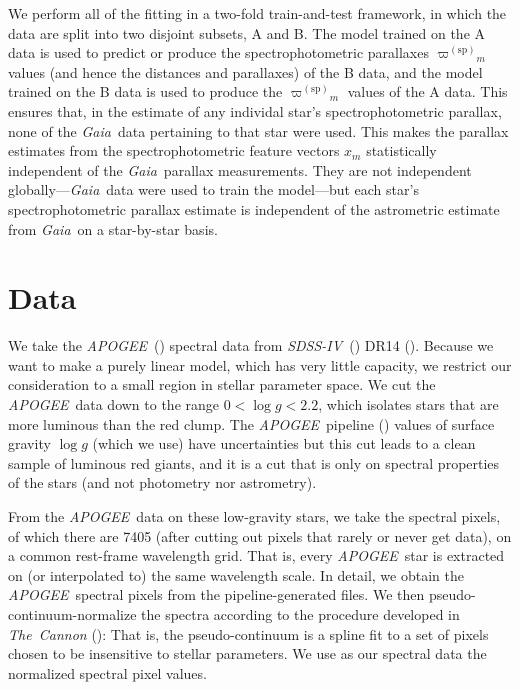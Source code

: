 \documentclass[modern]{aastex62}
\newcommand{\code}[1]{\texttt{\detokenize{#1}}}
\newcommand{\acronym}[1]{{\small{#1}}}
\newcommand{\project}[1]{\textsl{#1}}
\newcommand{\apogee}{\project{\acronym{APOGEE}}}
\newcommand{\gaia}{\project{Gaia}}
\newcommand{\sdssiv}{\project{\acronym{SDSS-IV}}}
\newcommand{\logg}{\log g}
\newcommand{\sparallax}{{\varpi^{(\mathrm{sp})}}}
\begin{document}
We perform all of the fitting in a two-fold train-and-test framework,
in which the data are split into two disjoint subsets, A and B.
The model trained on the A data is used to predict or produce
the spectrophotometric parallaxes $\sparallax_m$ values (and hence
the distances and parallaxes) of the B data,
and the model trained on the B data is used to 
produce the $\sparallax_m$ values of the A data.
This ensures that, in the estimate of any individal star's
spectrophotometric parallax, none of the \gaia\ data pertaining to that star were used.
This makes the parallax estimates from the spectrophotometric feature vectors
$x_m$ statistically independent of the \gaia\ parallax measurements.
They are not independent globally---\gaia\ data were used to train the model---but
each star's spectrophotometric parallax estimate is independent
of the astrometric estimate from \gaia\ on a star-by-star basis.

\section{Data}\label{sec:data}

We take the \apogee\ (\citealt{aapogee, wapogee, apogee}) spectral data
from \sdssiv\ (\citealt{sdssiv}) \acronym{DR14} (\citealt{dr14}).
Because we want to make a purely linear model, which has very little capacity,
we restrict our consideration to a small region in stellar parameter space.
We cut the \apogee\ data down to the range $0<\logg<2.2$, which isolates
stars that are more luminous than the red clump.
The \apogee\ pipeline (\citealt{aspcap})
values of surface gravity $\logg$ (which we use) have uncertainties but
this cut leads to a clean sample of luminous red giants, and it is a cut
that is only on spectral properties of the stars (and not photometry nor astrometry).

From the \apogee\ data on these low-gravity stars, we take the spectral pixels,
of which there are 7405 (after cutting out pixels that rarely or never get data),
on a common rest-frame wavelength grid.
That is, every \apogee\ star is extracted on (or interpolated to)
the same wavelength scale.
In detail, we obtain
the \apogee\ spectral pixels from the pipeline-generated \code{aspcapStar} files.
We then pseudo-continuum-normalize the spectra according to the procedure developed
in \project{The~Cannon} (\citealt{cannon}):
That is, the pseudo-continuum is a spline fit to a set
of pixels chosen to be insensitive to stellar parameters.
We use as our spectral data the normalized spectral pixel values.
\end{document}

